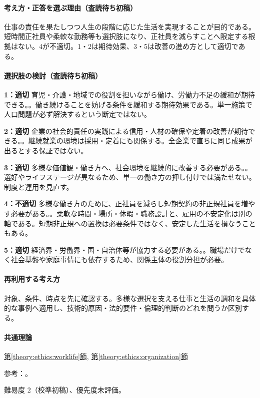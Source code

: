 \paragraph{考え方・正答を選ぶ理由（査読待ち初稿）} 仕事の責任を果たしつつ人生の段階に応じた生活を実現することが目的である。短時間正社員や柔軟な勤務等も選択肢になり、正社員を減らすことへ限定する根拠はない。4が不適切。1・2は期待効果、3・5は改善の進め方として適切である。

\paragraph{選択肢の検討（査読待ち初稿）}\mbox{}\par

\noindent\textbf{1：適切} 育児・介護・地域での役割を担いながら働け、労働力不足の緩和が期待できる。。働き続けることを妨げる条件を緩和する期待効果である。単一施策で人口問題が必ず解決するという断定ではない。\par

\noindent\textbf{2：適切} 企業の社会的責任の実践による信用・人材の確保や定着の改善が期待できる。。継続就業の環境は採用・定着にも関係する。全企業で直ちに同じ成果が出るとする保証ではない。\par

\noindent\textbf{3：適切} 多様な価値観・働き方へ、社会環境を継続的に改善する必要がある。。選好やライフステージが異なるため、単一の働き方の押し付けでは満たせない。制度と運用を見直す。\par

\noindent\textbf{4：不適切} 多様な働き方のために、正社員を減らし短期契約の非正規社員を増やす必要がある。。柔軟な時間・場所・休暇・職務設計と、雇用の不安定化は別の軸である。短期非正規への置換は必要条件ではなく、安定した生活を損なうこともある。\par

\noindent\textbf{5：適切} 経済界・労働界・国・自治体等が協力する必要がある。。職場だけでなく社会基盤や家庭事情にも依存するため、関係主体の役割分担が必要。\par

\paragraph{再利用する考え方} 対象、条件、時点を先に確認する。多様な選択を支える仕事と生活の調和を具体的な事例へ適用し、技術的原因・法的要件・倫理的判断のどれを問うか区別する。

\paragraph{共通理論} \hyperref[theory:ethics:worklife]{第\ref*{theory:ethics:worklife}節}, \hyperref[theory:ethics:organization]{第\ref*{theory:ethics:organization}節}

\par 参考：\cite{cabinet_worklife}。

\par 難易度 2（校準初稿）、優先度未評価。
